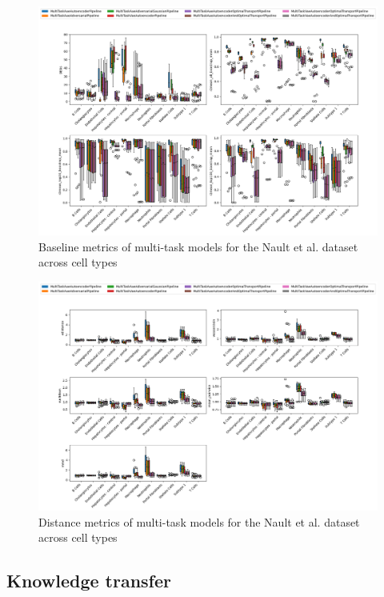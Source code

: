 \documentclass[12pt, a4paper]{article}
\begin{document}
\begin{figure}[h!]
    \centering
    \includegraphics[width=\textwidth]{multi_task_benchmarking_cell_type_baseline_metrics.png}
    \caption{Baseline metrics of multi-task models for the Nault et al. \cite{nault2021single,nault2022benchmarking} dataset across cell types}
\end{figure}


\begin{figure}[h!]
    \centering
    \includegraphics[width=\textwidth]{multi_task_benchmarking_cell_type_distance_metrics.png}
    \caption{Distance metrics of multi-task models for the Nault et al. \cite{nault2021single,nault2022benchmarking} dataset across cell types}
\end{figure}


\clearpage

\subsection{Knowledge transfer}
\end{document}
